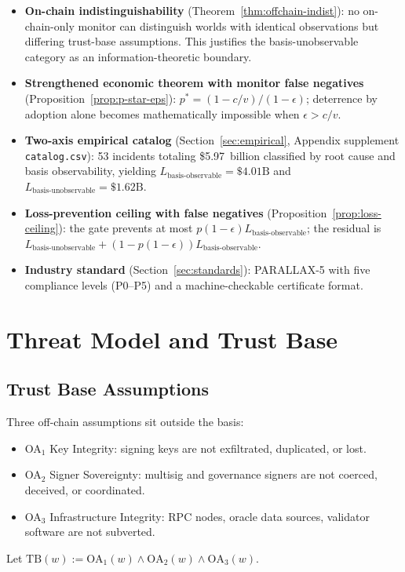 \documentclass[11pt,a4paper]{article}
\begin{document}
\begin{itemize}
  \item \textbf{On-chain indistinguishability} (Theorem~\ref{thm:offchain-indist}): no on-chain-only monitor can distinguish worlds with identical observations but differing trust-base assumptions. This justifies the basis-unobservable category as an information-theoretic boundary.
  \item \textbf{Strengthened economic theorem with monitor false negatives} (Proposition~\ref{prop:p-star-eps}): $p^* = (1-c/v)/(1-\epsilon)$; deterrence by adoption alone becomes mathematically impossible when $\epsilon > c/v$.
  \item \textbf{Two-axis empirical catalog} (Section~\ref{sec:empirical}, Appendix supplement \texttt{catalog.csv}): 53 incidents totaling \$5.97~billion classified by root cause and basis observability, yielding $L_{\mathrm{basis\text{-}observable}} = \$4.01\text{B}$ and $L_{\mathrm{basis\text{-}unobservable}} = \$1.62\text{B}$.
  \item \textbf{Loss-prevention ceiling with false negatives} (Proposition~\ref{prop:loss-ceiling}): the gate prevents at most $p(1-\epsilon) L_{\mathrm{basis\text{-}observable}}$; the residual is $L_{\mathrm{basis\text{-}unobservable}} + (1-p(1-\epsilon)) L_{\mathrm{basis\text{-}observable}}$.
  \item \textbf{Industry standard} (Section~\ref{sec:standards}): PARALLAX-5 with five compliance levels (P0--P5) and a machine-checkable certificate format.
\end{itemize}

\section{Threat Model and Trust Base}\label{sec:threat-model}

\subsection{Trust Base Assumptions}

Three off-chain assumptions sit outside the basis:
\begin{itemize}
  \item OA$_1$ Key Integrity: signing keys are not exfiltrated, duplicated, or lost.
  \item OA$_2$ Signer Sovereignty: multisig and governance signers are not coerced, deceived, or coordinated.
  \item OA$_3$ Infrastructure Integrity: RPC nodes, oracle data sources, validator software are not subverted.
\end{itemize}
Let $\mathrm{TB}(w) := \mathrm{OA}_1(w) \wedge \mathrm{OA}_2(w) \wedge \mathrm{OA}_3(w)$.
\end{document}
